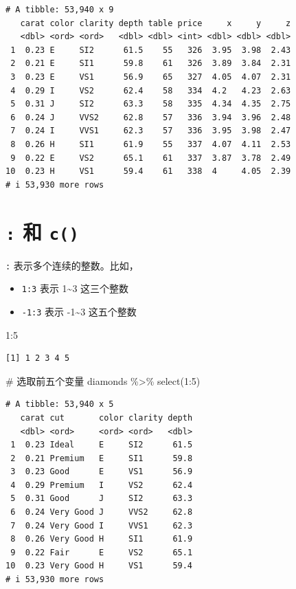 \documentclass[
  letterpaper,
]{ctexbook}
\newenvironment{Shaded}{\begin{snugshade}}{\end{snugshade}}
\newcommand{\CommentTok}[1]{\textcolor[rgb]{0.37,0.37,0.37}{#1}}
\newcommand{\DecValTok}[1]{\textcolor[rgb]{0.68,0.00,0.00}{#1}}
\newcommand{\FunctionTok}[1]{\textcolor[rgb]{0.28,0.35,0.67}{#1}}
\newcommand{\NormalTok}[1]{\textcolor[rgb]{0.00,0.23,0.31}{#1}}
\newcommand{\SpecialCharTok}[1]{\textcolor[rgb]{0.37,0.37,0.37}{#1}}
\providecommand{\tightlist}{%
  \setlength{\itemsep}{0pt}\setlength{\parskip}{0pt}}\usepackage{longtable,booktabs,array}
\begin{document}
\begin{verbatim}
# A tibble: 53,940 x 9
   carat color clarity depth table price     x     y     z
   <dbl> <ord> <ord>   <dbl> <dbl> <int> <dbl> <dbl> <dbl>
 1  0.23 E     SI2      61.5    55   326  3.95  3.98  2.43
 2  0.21 E     SI1      59.8    61   326  3.89  3.84  2.31
 3  0.23 E     VS1      56.9    65   327  4.05  4.07  2.31
 4  0.29 I     VS2      62.4    58   334  4.2   4.23  2.63
 5  0.31 J     SI2      63.3    58   335  4.34  4.35  2.75
 6  0.24 J     VVS2     62.8    57   336  3.94  3.96  2.48
 7  0.24 I     VVS1     62.3    57   336  3.95  3.98  2.47
 8  0.26 H     SI1      61.9    55   337  4.07  4.11  2.53
 9  0.22 E     VS2      65.1    61   337  3.87  3.78  2.49
10  0.23 H     VS1      59.4    61   338  4     4.05  2.39
# i 53,930 more rows
\end{verbatim}

\hypertarget{ux548c-c}{%
\section{\texorpdfstring{\texttt{:} 和
\texttt{c()}}{: 和 c()}}\label{ux548c-c}}

\texttt{:} 表示多个连续的整数。比如，

\begin{itemize}
\tightlist
\item
  \texttt{1:3} 表示 1\textasciitilde3 这三个整数
\item
  \texttt{-1:3} 表示 -1\textasciitilde3 这五个整数
\end{itemize}

\begin{Shaded}
\begin{Highlighting}[]
\DecValTok{1}\SpecialCharTok{:}\DecValTok{5}
\end{Highlighting}
\end{Shaded}

\begin{verbatim}
[1] 1 2 3 4 5
\end{verbatim}

\begin{Shaded}
\begin{Highlighting}[]
\CommentTok{\# 选取前五个变量}
\NormalTok{diamonds }\SpecialCharTok{\%\textgreater{}\%}
  \FunctionTok{select}\NormalTok{(}\DecValTok{1}\SpecialCharTok{:}\DecValTok{5}\NormalTok{)}
\end{Highlighting}
\end{Shaded}

\begin{verbatim}
# A tibble: 53,940 x 5
   carat cut       color clarity depth
   <dbl> <ord>     <ord> <ord>   <dbl>
 1  0.23 Ideal     E     SI2      61.5
 2  0.21 Premium   E     SI1      59.8
 3  0.23 Good      E     VS1      56.9
 4  0.29 Premium   I     VS2      62.4
 5  0.31 Good      J     SI2      63.3
 6  0.24 Very Good J     VVS2     62.8
 7  0.24 Very Good I     VVS1     62.3
 8  0.26 Very Good H     SI1      61.9
 9  0.22 Fair      E     VS2      65.1
10  0.23 Very Good H     VS1      59.4
# i 53,930 more rows
\end{verbatim}
\end{document}
